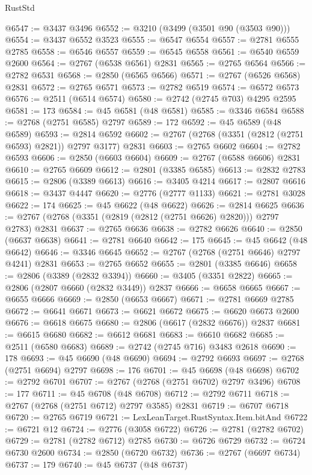 \begin{lexlean}{RustStd}
\begin{coremodule}
@6547 := @3437 @3496
@6552 := @3210 (@3499 (@3501 @90 (@3503 @90)))
@6554 := @3437 @6552 @3523
@6555 := @6547 @6554
@6557 := @2781 @6555 @2785
@6558 := @6546 @6557
@6559 := @6545 @6558
@6561 := @6540 @6559 @2600
@6564 := @2767 (@6538 @6561) @2831
@6565 := @2765 @6564
@6566 := @2782 @6531
@6568 := @2850 (@6565 @6566)
@6571 := @2767 (@6526 @6568) @2831
@6572 := @2765 @6571
@6573 := @2782 @6519
@6574 := @6572 @6573
@6576 := @2511 (@6514 @6574)
@6580 := @2742 (@2745 @703) @4295 @2595
@6581 := 173
@6584 := @45 @6581 (@48 @6581)
@6585 := @3346 @6584
@6588 := @2768 (@2751 @6585) @2797
@6589 := 172
@6592 := @45 @6589 (@48 @6589)
@6593 := @2814 @6592
@6602 := @2767 (@2768 (@3351 (@2812 (@2751 @6593) @2821)) @2797 @3177) @2831
@6603 := @2765 @6602
@6604 := @2782 @6593
@6606 := @2850 (@6603 @6604)
@6609 := @2767 (@6588 @6606) @2831
@6610 := @2765 @6609
@6612 := @2801 (@3385 @6585)
@6613 := @2832 @2783
@6615 := @2806 (@3389 @6613)
@6616 := @3405 @4214
@6617 := @2807 @6616
@6618 := @3437 @4447
@6620 := @2776 (@2777 @1133)
@6621 := @2781 @3028
@6622 := 174
@6625 := @45 @6622 (@48 @6622)
@6626 := @2814 @6625
@6636 := @2767 (@2768 (@3351 (@2819 (@2812 (@2751 @6626) @2820))) @2797 @2783) @2831
@6637 := @2765 @6636
@6638 := @2782 @6626
@6640 := @2850 (@6637 @6638)
@6641 := @2781 @6640
@6642 := 175
@6645 := @45 @6642 (@48 @6642)
@6646 := @3346 @6645
@6652 := @2767 (@2768 (@2751 @6646) @2797 @4241) @2831
@6653 := @2765 @6652
@6655 := @2801 (@3385 @6646)
@6658 := @2806 (@3389 (@2832 @3394))
@6660 := @3405 (@3351 @2822)
@6665 := @2806 (@2807 @6660 (@2832 @3449)) @2837
@6666 := @6658 @6665
@6667 := @6655 @6666
@6669 := @2850 (@6653 @6667)
@6671 := @2781 @6669 @2785
@6672 := @6641 @6671
@6673 := @6621 @6672
@6675 := @6620 @6673 @2600
@6676 := @6618 @6675
@6680 := @2806 (@6617 (@2832 @6676)) @2837
@6681 := @6615 @6680
@6682 := @6612 @6681
@6683 := @6610 @6682
@6685 := @2511 (@6580 @6683)
@6689 := @2742 (@2745 @716) @3483 @2618
@6690 := 178
@6693 := @45 @6690 (@48 @6690)
@6694 := @2792 @6693
@6697 := @2768 (@2751 @6694) @2797
@6698 := 176
@6701 := @45 @6698 (@48 @6698)
@6702 := @2792 @6701
@6707 := @2767 (@2768 (@2751 @6702) @2797 @3496)
@6708 := 177
@6711 := @45 @6708 (@48 @6708)
@6712 := @2792 @6711
@6718 := @2767 (@2768 (@2751 @6712) @2797 @3585) @2831
@6719 := @6707 @6718
@6720 := @2765 @6719
@6721 := LexLeanTarget.RustSyntax.Item.bitAnd
@6722 := @6721 @12
@6724 := @2776 (@3058 @6722)
@6726 := @2781 (@2782 @6702)
@6729 := @2781 (@2782 @6712) @2785
@6730 := @6726 @6729
@6732 := @6724 @6730 @2600
@6734 := @2850 (@6720 @6732)
@6736 := @2767 (@6697 @6734)
@6737 := 179
@6740 := @45 @6737 (@48 @6737)

\end{coremodule}
\end{lexlean}
